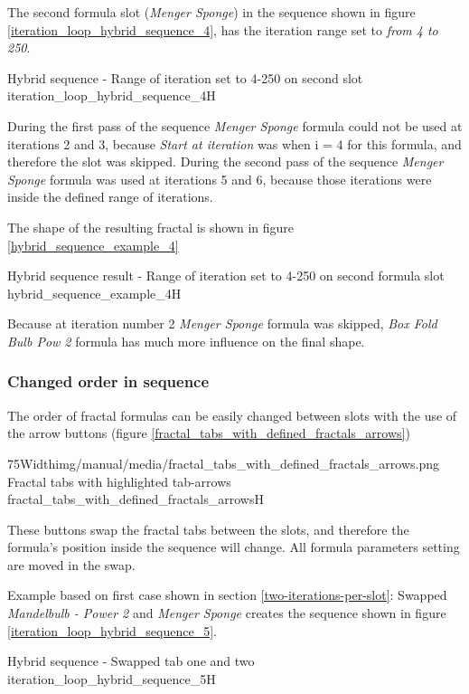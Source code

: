 The second formula slot (\emph{Menger Sponge}) in the sequence shown in figure \ref{iteration_loop_hybrid_sequence_4}, has the iteration range set to \emph{from 4 to 250}.


{Hybrid sequence - Range of iteration set to 4-250 on second slot}
{iteration_loop_hybrid_sequence_4}{H}

During the first pass of the sequence \emph{Menger Sponge} formula could not be used at iterations 2 and 3,
because \emph{Start at iteration} was when i = 4 for this formula, and therefore the slot was skipped.
During the second pass of the sequence \emph{Menger Sponge} formula was used at iterations 5 and 6,
because those iterations were inside the defined range of iterations.

The shape of the resulting fractal is shown in figure \ref{hybrid_sequence_example_4}

{Hybrid sequence result - Range of iteration set to 4-250 on second formula slot}
{hybrid_sequence_example_4}{H}

Because at iteration number 2 \emph{Menger Sponge} formula was skipped, \emph{Box Fold Bulb Pow 2} formula has much more influence on the final shape.

\subsubsection{Changed order in sequence}

The order of fractal formulas can be easily changed between slots with the use of the arrow buttons (figure \ref{fractal_tabs_with_defined_fractals_arrows})

\simpleImageWithCaption75Width{img/manual/media/fractal_tabs_with_defined_fractals_arrows.png}
{Fractal tabs with highlighted tab-arrows}
{fractal_tabs_with_defined_fractals_arrows}{H}

These buttons swap the fractal tabs between the slots, and therefore  the formula's position inside the sequence will change. All formula parameters setting are moved in the swap.

Example based on first case shown in section \ref{two-iterations-per-slot}:
Swapped \emph{Mandelbulb - Power 2} and \emph{Menger Sponge} creates the sequence shown in figure \ref{iteration_loop_hybrid_sequence_5}.

{Hybrid sequence - Swapped tab one and two}
{iteration_loop_hybrid_sequence_5}{H}

